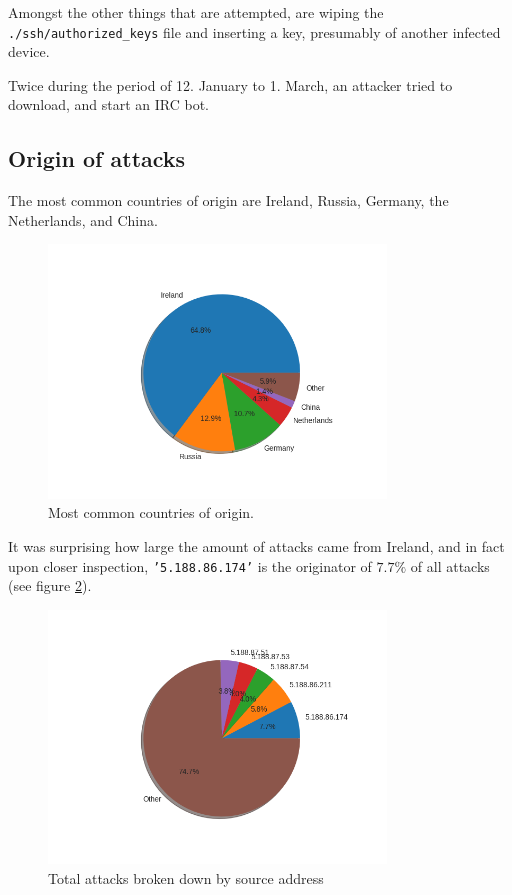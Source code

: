     Amongst the other things that are attempted, 
    are wiping the \texttt{./ssh/authorized\_keys} file and
    inserting a key, presumably of another infected
    device. 

    Twice during the period of 12. January to 1. March, 
    an attacker tried to download, and start an IRC bot.

    

\subsection{Origin of attacks}
\label{sec:origin_analysis}


    The most common countries of origin are Ireland, Russia,
    Germany, the Netherlands, and China.

    \begin{figure}[H]
        \centering
        \includegraphics[width=0.8\textwidth]{src/images/countries_pie.png}
        \caption{Most common countries of origin.}
        \label{fig:country_pie}
    \end{figure}

    It was surprising how large the amount of attacks came from
    Ireland, and in fact upon closer inspection, 
    \texttt{'5.188.86.174'} is the originator of 
    $7.7\%$ of all attacks 
    (see figure \ref{fig:attacks_by_ip}).

    \begin{figure}[H]
        \centering
        \includegraphics[width=0.8\textwidth]{src/images/ip_breakdown.png}
        \caption{Total attacks broken down by source address}
        \label{fig:attacks_by_ip}
    \end{figure}


